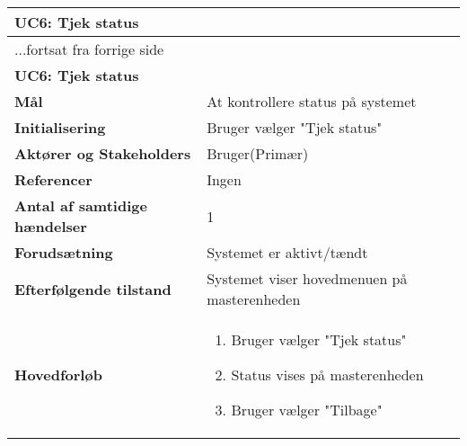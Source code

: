 \begin{center} \centering
	\begin{longtable}{|p{6cm}|p{8cm}|}  %
	\hline
		\multicolumn{2}{|l|}{\textbf{UC6: Tjek status}} \\\hline %
		\endfirsthead
		
		\multicolumn{2}{l}{...fortsat fra forrige side} \\ \hline %
		\multicolumn{2}{|l|}{\textbf{UC6: Tjek status}} \\\hline %
		\endhead	
		
		\textbf{Mål}								&At kontrollere status på systemet			\\\hline
		\textbf{Initialisering}					&Bruger vælger "Tjek status"			\\\hline
		\textbf{Aktører og Stakeholders}			&Bruger(Primær)			\\\hline
		\textbf{Referencer}						&Ingen			\\\hline
		\textbf{Antal af samtidige hændelser}	&1			\\\hline
		\textbf{Forudsætning}					&Systemet er aktivt/tændt			\\\hline
		\textbf{Efterfølgende tilstand}			&Systemet viser hovedmenuen på masterenheden			\\\hline
		\textbf{Hovedforløb}					
			&\begin{enumerate}
	
				\item Bruger vælger "Tjek status"
				
				\item Status vises på masterenheden
				
				\item Bruger vælger "Tilbage"
	
			\end{enumerate}\\\hline
	\end{longtable}
	\label{UC6} 
\end{center}

